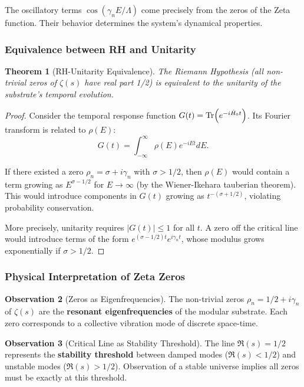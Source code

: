 \documentclass[11pt, a4paper]{article}
\theoremstyle{plain}
\newtheorem{theorem}{Theorem}[section]
\theoremstyle{definition}
\newtheorem{observation}[theorem]{Observation}
\begin{document}
The oscillatory terms $\cos(\gamma_n E/\Lambda)$ come precisely from the zeros of the Zeta function. Their behavior determines the system's dynamical properties.

\subsubsection{Equivalence between RH and Unitarity}

\begin{theorem}[RH-Unitarity Equivalence]
The Riemann Hypothesis (all non-trivial zeros of $\zeta(s)$ have real part 1/2) is equivalent to the unitarity of the substrate's temporal evolution.
\end{theorem}

\begin{proof}
Consider the temporal response function $G(t) = \Tr(e^{-i\hat{H}_0 t})$. Its Fourier transform is related to $\rho(E)$:
\begin{equation}
G(t) = \int_{-\infty}^\infty \rho(E) e^{-iEt} dE.
\end{equation}

If there existed a zero $\rho_n = \sigma + i\gamma_n$ with $\sigma > 1/2$, then $\rho(E)$ would contain a term growing as $E^{\sigma-1/2}$ for $E \to \infty$ (by the Wiener-Ikehara tauberian theorem). This would introduce components in $G(t)$ growing as $t^{-(\sigma+1/2)}$, violating probability conservation.

More precisely, unitarity requires $|G(t)| \leq 1$ for all $t$. A zero off the critical line would introduce terms of the form $e^{(\sigma-1/2)t} e^{i\gamma_n t}$, whose modulus grows exponentially if $\sigma > 1/2$.
\end{proof}

\subsubsection{Physical Interpretation of Zeta Zeros}

\begin{observation}[Zeros as Eigenfrequencies]
The non-trivial zeros $\rho_n = 1/2 + i\gamma_n$ of $\zeta(s)$ are the \textbf{resonant eigenfrequencies} of the modular substrate. Each zero corresponds to a collective vibration mode of discrete space-time.
\end{observation}

\begin{observation}[Critical Line as Stability Threshold]
The line $\Re(s) = 1/2$ represents the \textbf{stability threshold} between damped modes ($\Re(s) < 1/2$) and unstable modes ($\Re(s) > 1/2$). Observation of a stable universe implies all zeros must be exactly at this threshold.
\end{observation}
\end{document}
